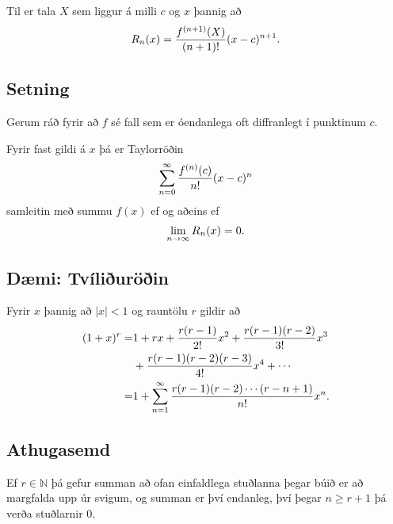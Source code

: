 \documentclass[a4paper,10pt,icelandic]{sphinxmanual}
\begin{document}
Til er tala \(X\) sem liggur á milli \(c\) og \(x\) þannig
að
\begin{gather}
\begin{split}R_n(x)=\frac{f^{(n+1)}(X)}{(n+1)!}(x-c)^{n+1}.\end{split}\notag
\end{gather}

\subsection{Setning}
\label{kafli10:id5}
Gerum ráð fyrir að \(f\) sé fall sem er óendanlega oft diffranlegt í
punktinum \(c\).

Fyrir fast gildi á \(x\) þá er Taylorröðin
\begin{gather}
\begin{split}\sum_{n=0}^\infty \frac{f^{(n)}(c)}{n!}(x-c)^n\end{split}\notag
\end{gather}
samleitin með summu \(f(x)\) ef og aðeins ef
\begin{gather}
\begin{split}\lim_{n\rightarrow\infty}R_n(x)=0.\end{split}\notag
\end{gather}

\subsection{Dæmi: Tvíliðuröðin}
\label{kafli10:daemi-tviliuroin}\label{kafli10:index-7}
Fyrir \(x\) þannig að \(|x|<1\) og rauntölu \(r\) gildir að
\begin{gather}
\begin{split}\begin{aligned}
(1+x)^r =& 1+rx+\frac{r(r-1)}{2!}x^2+ \frac{r(r-1)(r-2)}{3!}x^3 \\
&+\frac{r(r-1)(r-2)(r-3)}{4!}x^4+\cdots\\
=& 1+ \sum_{n=1}^\infty \frac{r(r-1)(r-2)\cdots(r-n+1)}{n!}x^n.\end{aligned}\end{split}\notag
\end{gather}

\subsection{Athugasemd}
\label{kafli10:id6}
Ef \(r \in {{\mathbb  N}}\) þá gefur summan að ofan einfaldlega
stuðlanna þegar búið er að margfalda upp úr svigum, og summan er því
endanleg, því þegar \(n \geq r+1\) þá verða stuðlarnir 0.
\end{document}
